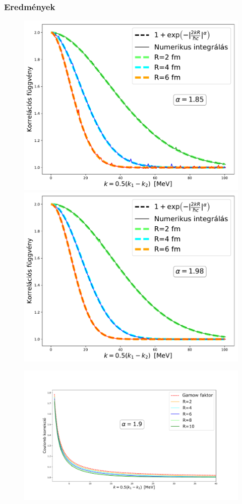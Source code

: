 \documentclass[10pt,a4paper]{article}
\numberwithin{equation}{subsection}
\numberwithin{figure}{section}
\begin{document}
\subsubsection{Eredmények}
\begin{figure}[H]
\centering
\includegraphics[scale=0.36]{pic/Coulomb/C2_noCoulomb_R246_a185.pdf}
\includegraphics[scale=0.36]{pic/Coulomb/C2_noCoulomb_R246_a198.pdf}
\end{figure}
\begin{figure}[H]
\centering
\includegraphics[scale=0.45]{pic/Coulomb/C2_dR_a19_v2.pdf}
\end{figure}
\end{document}
